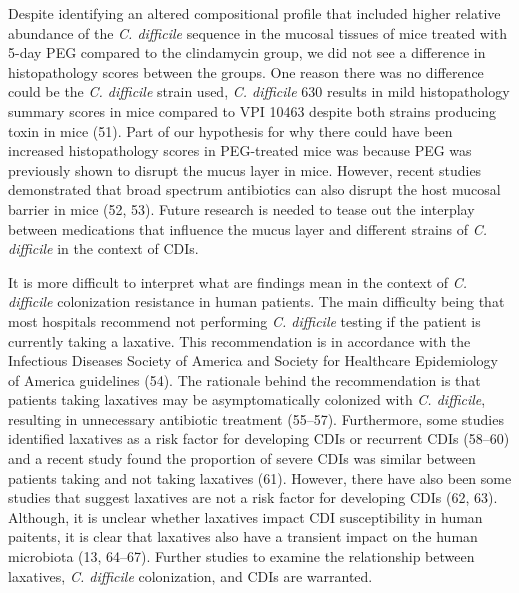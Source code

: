 \documentclass[
  11pt,
]{article}
\begin{document}
Despite identifying an altered compositional profile that included
higher relative abundance of the \emph{C. difficile} sequence in the
mucosal tissues of mice treated with 5-day PEG compared to the
clindamycin group, we did not see a difference in histopathology scores
between the groups. One reason there was no difference could be the
\emph{C. difficile} strain used, \emph{C. difficile} 630 results in mild
histopathology summary scores in mice compared to VPI 10463 despite both
strains producing toxin in mice (51). Part of our hypothesis for why
there could have been increased histopathology scores in PEG-treated
mice was because PEG was previously shown to disrupt the mucus layer in
mice. However, recent studies demonstrated that broad spectrum
antibiotics can also disrupt the host mucosal barrier in mice (52, 53).
Future research is needed to tease out the interplay between medications
that influence the mucus layer and different strains of \emph{C.
difficile} in the context of CDIs.

It is more difficult to interpret what are findings mean in the context
of \emph{C. difficile} colonization resistance in human patients. The
main difficulty being that most hospitals recommend not performing
\emph{C. difficile} testing if the patient is currently taking a
laxative. This recommendation is in accordance with the Infectious
Diseases Society of America and Society for Healthcare Epidemiology of
America guidelines (54). The rationale behind the recommendation is that
patients taking laxatives may be asymptomatically colonized with
\emph{C. difficile}, resulting in unnecessary antibiotic treatment
(55--57). Furthermore, some studies identified laxatives as a risk
factor for developing CDIs or recurrent CDIs (58--60) and a recent study
found the proportion of severe CDIs was similar between patients taking
and not taking laxatives (61). However, there have also been some
studies that suggest laxatives are not a risk factor for developing CDIs
(62, 63). Although, it is unclear whether laxatives impact CDI
susceptibility in human paitents, it is clear that laxatives also have a
transient impact on the human microbiota (13, 64--67). Further studies
to examine the relationship between laxatives, \emph{C. difficile}
colonization, and CDIs are warranted.
\end{document}
